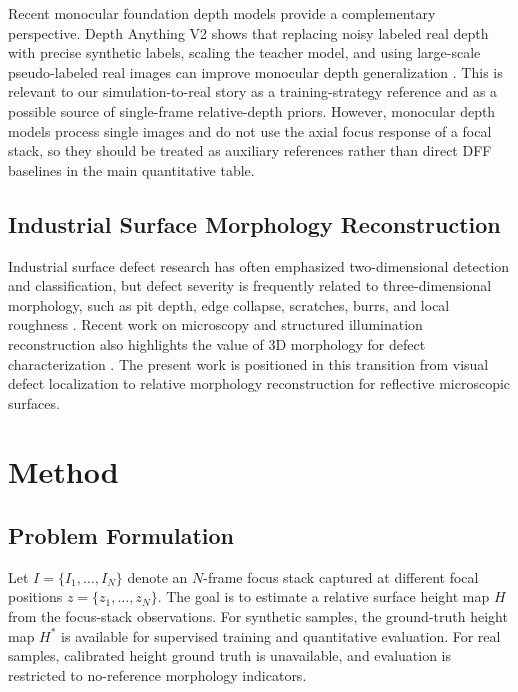 \documentclass[11pt,a4paper]{article}
\begin{document}
Recent monocular foundation depth models provide a complementary perspective. Depth Anything V2 shows that replacing noisy labeled real depth with precise synthetic labels, scaling the teacher model, and using large-scale pseudo-labeled real images can improve monocular depth generalization \cite{depth_anything_v2_2024}. This is relevant to our simulation-to-real story as a training-strategy reference and as a possible source of single-frame relative-depth priors. However, monocular depth models process single images and do not use the axial focus response of a focal stack, so they should be treated as auxiliary references rather than direct DFF baselines in the main quantitative table.

\subsection{Industrial Surface Morphology Reconstruction}

Industrial surface defect research has often emphasized two-dimensional detection and classification, but defect severity is frequently related to three-dimensional morphology, such as pit depth, edge collapse, scratches, burrs, and local roughness \cite{ren_surface_2021}. Recent work on microscopy and structured illumination reconstruction also highlights the value of 3D morphology for defect characterization \cite{wang_defect_2026}. The present work is positioned in this transition from visual defect localization to relative morphology reconstruction for reflective microscopic surfaces.

\section{Method}

\subsection{Problem Formulation}

Let \(I=\{I_1,\ldots,I_N\}\) denote an \(N\)-frame focus stack captured at different focal positions \(z=\{z_1,\ldots,z_N\}\). The goal is to estimate a relative surface height map \(H\) from the focus-stack observations. For synthetic samples, the ground-truth height map \(H^\ast\) is available for supervised training and quantitative evaluation. For real samples, calibrated height ground truth is unavailable, and evaluation is restricted to no-reference morphology indicators.
\end{document}
